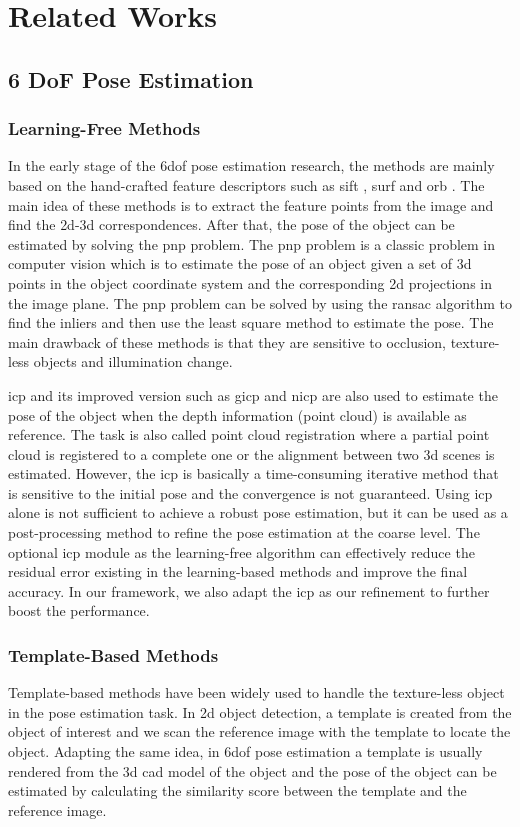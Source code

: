 \documentclass[12pt,DIV14,BCOR12mm,a4paper,footinclude=false,headinclude,parskip=half-,twoside,openright,cleardoublepage=empty,toc=index,bibliography=totoc,listof=totoc]{scrreprt}
\numberwithin{equation}{chapter}
\begin{document}
\chapter{Related Works}
\section{6 DoF Pose Estimation}
\subsection{Learning-Free Methods}
In the early stage of the \gls{6dof} pose estimation research, the methods are mainly based on the hand-crafted feature descriptors such as \gls{sift} \cite{sift}, \gls{surf} \cite{surf} and \gls{orb} \cite{6126544}. The main idea of these methods is to extract the feature points from the image and find the \gls{2d}-\gls{3d} correspondences. After that, the pose of the object can be estimated by solving the \gls{pnp} problem. The \gls{pnp} problem is a classic problem in computer vision which is to estimate the pose of an object given a set of \gls{3d} points in the object coordinate system and the corresponding \gls{2d} projections in the image plane. The \gls{pnp} problem can be solved by using the \gls{ransac} \cite{10.1145/358669.358692} algorithm to find the inliers and then use the least square method to estimate the pose. The main drawback of these methods is that they are sensitive to occlusion, texture-less objects and illumination change. 

\gls{icp} \cite{Besl1992AMF} and its improved version such as \gls{gicp} \cite{gicp} and \gls{nicp} \cite{nicp} are also used to estimate the pose of the object when the depth information (point cloud) is available as reference. The task is also called point cloud registration where a partial point cloud is registered to a complete one or the alignment between two \gls{3d} scenes is estimated. However, the \gls{icp} is basically a time-consuming iterative method that is sensitive to the initial pose and the convergence is not guaranteed. Using \gls{icp} alone is not sufficient to achieve a robust pose estimation, but it can be used as a post-processing method to refine the pose estimation at the coarse level. The optional \gls{icp} module as the learning-free algorithm can effectively reduce the residual error existing in the learning-based methods and improve the final accuracy. In our framework, we also adapt the \gls{icp} as our refinement to further boost the performance.
\subsection{Template-Based Methods}
Template-based methods have been widely used to handle the texture-less object in the pose estimation task. In \gls{2d} object detection, a template is created from the object of interest and we scan the reference image with the template to locate the object. Adapting the same idea, in \gls{6dof} pose estimation a template is usually rendered from the \gls{3d} \gls{cad} model of the object and the pose of the object can be estimated by calculating the similarity score between the template and the reference image. 
\end{document}
